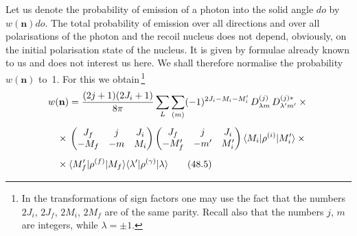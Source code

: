 Let us denote the probability of emission of a photon into the solid angle $do$ by $w(\mathbf{n})do$. The total probability of emission over all directions and over all polarisations of the photon and the recoil nucleus does not depend, obviously, on the initial polarisation state of the nucleus. It is given by formulae already known to us and does not interest us here. We shall therefore normalise the probability $w(\mathbf{n})$ to~1. For this we obtain\,\footnote[2]{In the transformations of sign factors one may use the fact that the numbers $2J_i$, $2J_f$, $2M_i$, $2M_f$ are of the same parity. Recall also that the numbers $j$, $m$ are integers, while $\lambda = \pm 1$.}
\begin{align}
w(\mathbf{n}) &= \frac{(2j+1)(2J_i+1)}{8\pi}\sum_L\sum_{(m)}(-1)^{2J_i - M_i - M'_i}\,D^{(j)}_{\lambda m}\,D^{(j)*}_{\lambda'm'}\times{}\notag\\[4pt]
{}\times{}&\begin{pmatrix} J_f & j & J_i \\ -M_f & -m & M_i\end{pmatrix}
\begin{pmatrix} J_f & j & J_i \\ -M'_f & -m' & M'_i\end{pmatrix}
\langle M_i|\rho^{(i)}|M'_i\rangle\times{}\notag\\[4pt]
{}\times{}&\langle M'_f|\rho^{(f)}|M_f\rangle\langle\lambda'|\rho^{(\gamma)}|\lambda\rangle
\tag{48.5}
\end{align}

